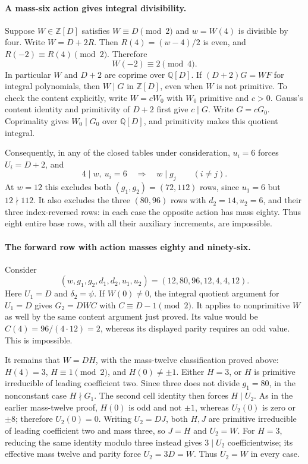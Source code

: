 \paragraph{A mass-six action gives integral divisibility.}
Suppose $W\in\mathbb Z[D]$ satisfies $W\equiv D\pmod2$
and $w=W(4)$ is divisible by four.
Write $W=D+2R$. Then $R(4)=(w-4)/2$ is even,
and $R(-2)\equiv R(4)\pmod2$. Therefore
\[
                         W(-2)\equiv2\pmod4.        \tag{G036.U1}
\]
In particular $W$ and $D+2$ are coprime over
$\mathbb Q[D]$.
If $(D+2)G=W F$ for integral polynomials, then
$W\mid G$ in $\mathbb Z[D]$, even when $W$ is
not primitive. To check the content explicitly,
write $W=cW_0$ with $W_0$ primitive and $c>0$.
Gauss's content identity and primitivity of $D+2$
first give $c\mid G$. Write $G=cG_0$.
Coprimality gives $W_0\mid G_0$ over $\mathbb Q[D]$,
and primitivity makes this quotient integral.

Consequently, in any of the closed tables under
consideration, $u_i=6$ forces $U_i=D+2$, and
\[
                 4\mid w,\ u_i=6
                 \quad\Longrightarrow\quad w\mid g_j
                 \qquad(i\ne j).                  \tag{G036.U2}
\]
At $w=12$ this excludes both $(g_1,g_2)=(72,112)$
rows, since $u_1=6$ but $12\nmid112$.
It also excludes the three $(80,96)$ rows with
$d_2=14,u_2=6$, and their three index-reversed rows:
in each case the opposite action has mass eighty.
Thus eight entire base rows, with all their auxiliary
increments, are impossible.

\paragraph{The forward row with action masses eighty and ninety-six.}
Consider
\[
 (w,g_1,g_2,d_1,d_2,u_1,u_2)
                    =(12,80,96,12,4,4,12).         \tag{G036.U3}
\]
Here $U_1=D$ and $\delta_2=\psi$.
If $W(0)\ne0$, the integral quotient argument for
$U_1=D$ gives
$G_2=DWC$ with $C\equiv D-1\pmod2$.
It applies to nonprimitive $W$ as well by the same
content argument just proved. Its value would be
$C(4)=96/(4\cdot12)=2$, whereas its displayed
parity requires an odd value. This is impossible.

It remains that $W=DH$, with the mass-twelve
classification proved above: $H(4)=3$,
$H\equiv1\pmod2$, and $H(0)\ne\pm1$.
Either $H=3$, or $H$ is primitive irreducible
of leading coefficient two.
Since three does not divide $g_1=80$, in the
nonconstant case $H\nmid G_1$.
The second cell identity then forces $H\mid U_2$.
As in the earlier mass-twelve proof, $H(0)$ is
odd and not $\pm1$, whereas $U_2(0)$ is zero
or $\pm8$; therefore $U_2(0)=0$.
Writing $U_2=DJ$, both $H,J$ are primitive
irreducible of leading coefficient two and mass
three, so $J=H$ and $U_2=W$.
For $H=3$, reducing the same identity modulo
three instead gives $3\mid U_2$ coefficientwise;
its effective mass twelve and parity force
$U_2=3D=W$. Thus $U_2=W$ in every case.

